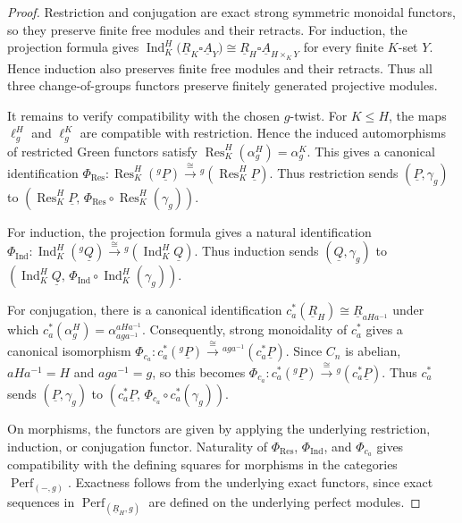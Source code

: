 \documentclass[11pt,oneside]{amsart}
\numberwithin{equation}{section}
\numberwithin{figure}{section}
\theoremstyle{plain}
\theoremstyle{definition}
\theoremstyle{remark}
\begin{document}
\begin{proof}
Restriction and conjugation are exact strong symmetric monoidal functors,
so they preserve finite free modules and their retracts. For induction,
the projection formula gives
\(
\operatorname{Ind}_K^H
\bigl(\underline R_K\square\underline A_Y\bigr)
\cong
\underline R_H\square\underline A_{H\times_KY}
\)
for every finite \(K\)-set \(Y\). Hence induction also preserves finite
free modules and their retracts. Thus all three change-of-groups functors
preserve finitely generated projective modules.

It remains to verify compatibility with the chosen \(g\)-twist.
For \(K\leq H\), the maps \(\ell_g^H\) and \(\ell_g^K\) are compatible
with restriction. Hence the induced automorphisms of restricted Green
functors satisfy
\(\operatorname{Res}^H_K(\alpha_g^H)=\alpha_g^K\). This gives a canonical identification
\(
\Phi_{\operatorname{Res}}\colon
\operatorname{Res}^H_K({}^g\underline P)
\xrightarrow{\cong}
{}^g(\operatorname{Res}^H_K\underline P).
\)
Thus restriction sends \((\underline P,\gamma_{g})\) to
\(
\left(
\operatorname{Res}^H_K\underline P,\,
\Phi_{\operatorname{Res}}\circ
\operatorname{Res}^H_K(\gamma_{g})
\right).
\)

For induction, the projection formula gives a natural identification
\(
\Phi_{\operatorname{Ind}}\colon
\operatorname{Ind}^H_K({}^g\underline Q)
\xrightarrow{\cong}
{}^g(\operatorname{Ind}^H_K\underline Q).
\)
Thus induction sends \((\underline Q,\gamma_{g})\) to
\(
\left(
\operatorname{Ind}^H_K\underline Q,\,
\Phi_{\operatorname{Ind}}\circ
\operatorname{Ind}^H_K(\gamma_{g})
\right).
\)

For conjugation, there is a canonical identification
\(
c_a^*(\underline R_H)
\cong
\underline R_{aHa^{-1}}
\)
under which
\(
c_a^*(\alpha_g^H)
=
\alpha_{aga^{-1}}^{aHa^{-1}}.
\)
Consequently, strong monoidality of \(c_a^*\) gives a canonical
isomorphism
\(
\Phi_{c_a}\colon
c_a^*({}^g\underline P)
\xrightarrow{\cong}
{}^{aga^{-1}}(c_a^*\underline P).
\)
Since \(C_n\) is abelian, \(aHa^{-1}=H\) and \(aga^{-1}=g\), so this
becomes
\(
\Phi_{c_a}\colon
c_a^*({}^g\underline P)
\xrightarrow{\cong}
{}^g(c_a^*\underline P).
\)
Thus \(c_a^*\) sends \((\underline P,\gamma_{g})\) to
\(
\left(
c_a^*\underline P,\,
\Phi_{c_a}\circ c_a^*(\gamma_{g})
\right).
\)
 


On morphisms, the functors are given by applying the underlying
restriction, induction, or conjugation functor. Naturality of \(\Phi_{\operatorname{Res}}\), \(\Phi_{\operatorname{Ind}}\),
and \(\Phi_{c_a}\) gives compatibility with the defining squares for
morphisms in the categories \(\operatorname{Perf}_{(-,g)}\). Exactness follows from the underlying exact functors,
since exact sequences in \(\operatorname{Perf}_{(\underline R_H,g)}\) are
defined on the underlying perfect modules.
\end{proof}
\end{document}
